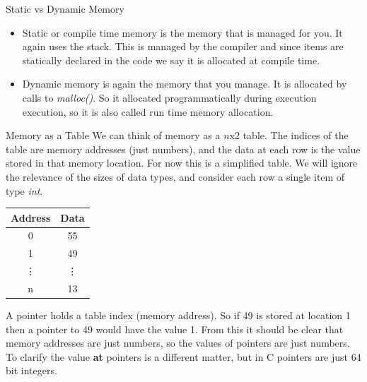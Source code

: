 \documentclass{beamer}
\begin{document}
\begin{frame}{Static vs Dynamic Memory}
	\begin{itemize}
		\item Static or compile time memory is the memory that is managed for you. It again uses the stack. This is managed by the compiler and since items are statically declared in the code we say it is allocated at compile time.

		\item Dynamic memory is again the memory that you manage. It is allocated by calls to {\it malloc()}. So it allocated programmatically during execution execution, so it is also called run time memory allocation.
	\end{itemize}
\end{frame}

\begin{frame}{Memory as a Table}
	We can think of memory as a $n$x2 table. The indices of the table are memory addresses (just numbers), and the data at each row is the value stored in that memory location. For now this is a simplified table. We will ignore the relevance of the sizes of data types, and consider each row a single item of type {\it int}.

	\begin{tabular}{|c|c|}
		\hline
		Address & Data\\
		\hline
		0 & 55 \\
		\hline
		1 & 49 \\
		\hline
		\vdots & \vdots \\
		\hline
		n & 13\\
		\hline
	\end{tabular}

A pointer holds a table index (memory address). So if 49 is stored at location 1 then a pointer to 49 would have the value 1. From this it should be clear that memory addresses are just numbers, so the values of pointers are just numbers. To clarify the value {\bf at} pointers is a different matter, but in C pointers are just 64 bit integers.
\end{frame}
\end{document}
